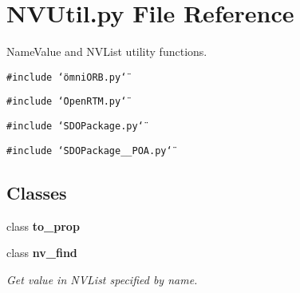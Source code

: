 \section{NVUtil.py File Reference}
\label{NVUtil_8py}
Name\-Value and NVList utility functions. 

{\tt \#include \char`\"{}omni\-ORB.py\char`\"{}}\par
{\tt \#include \char`\"{}Open\-RTM.py\char`\"{}}\par
{\tt \#include \char`\"{}SDOPackage.py\char`\"{}}\par
{\tt \#include \char`\"{}SDOPackage\_\-\_\-POA.py\char`\"{}}\par
\subsection*{Classes}
\begin{CompactItemize}
\item 
class {\bf to\_\-prop}
\item 
class {\bf nv\_\-find}
\begin{CompactList}\small\item\em Get value in NVList specified by name. \item\end{CompactList}\end{CompactItemize}
